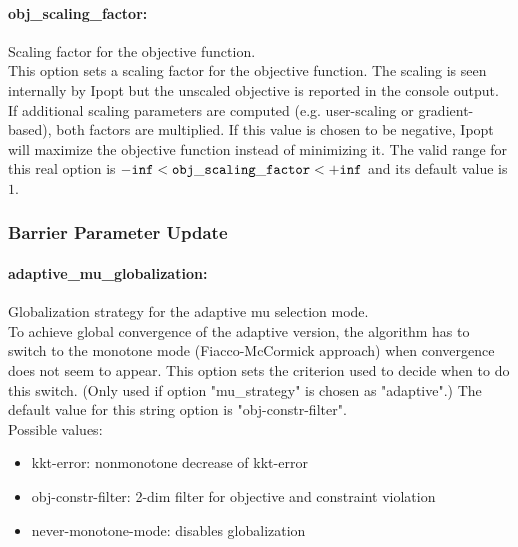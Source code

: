 \paragraph{obj\_scaling\_factor:}\label{sec:obj_scaling_factor} Scaling factor for the objective function. $\;$ \\
 This option sets a scaling factor for the
objective function. The scaling is seen
internally by Ipopt but the unscaled objective is
reported in the console output. If additional
scaling parameters are computed (e.g.
user-scaling or gradient-based), both factors are
multiplied. If this value is chosen to be
negative, Ipopt will maximize the objective
function instead of minimizing it. The valid range for this real option is 
${\tt -inf} <  {\tt obj\_scaling\_factor } <  {\tt +inf}$
and its default value is $1$.



\subsubsection{Barrier Parameter Update}
\label{sec:Barrier_Parameter_Update}

\paragraph{adaptive\_mu\_globalization:}\label{sec:adaptive_mu_globalization} Globalization strategy for the adaptive mu selection mode. $\;$ \\
 To achieve global convergence of the adaptive
version, the algorithm has to switch to the
monotone mode (Fiacco-McCormick approach) when
convergence does not seem to appear.  This option
sets the criterion used to decide when to do this
switch. (Only used if option "mu\_strategy" is
chosen as "adaptive".)
The default value for this string option is "obj-constr-filter".
\\ 
Possible values:
\begin{itemize}
   \item kkt-error: nonmonotone decrease of kkt-error
   \item obj-constr-filter: 2-dim filter for objective and constraint
violation
   \item never-monotone-mode: disables globalization
\end{itemize}

